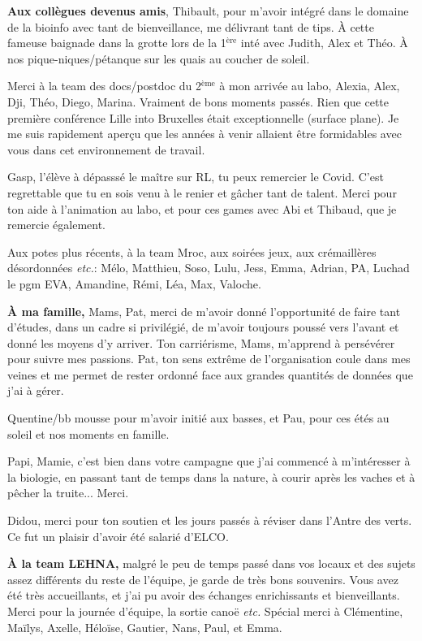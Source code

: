 \vspace*{7pt}
\textbf{Aux collègues devenus amis}, Thibault, pour m'avoir intégré dans le domaine de la bioinfo avec tant de bienveillance, me délivrant tant de tips. À cette fameuse baignade dans la grotte lors de la 1$^\text{ère}$ inté avec Judith, Alex et Théo. À nos pique-niques/pétanque sur les quais au coucher de soleil.

Merci à la team des docs/postdoc du 2$^\text{ème}$ à mon arrivée au labo, Alexia, Alex, Dji, Théo, Diego, Marina. Vraiment de bons moments passés. Rien que cette première conférence Lille into Bruxelles était exceptionnelle (surface plane). Je me suis rapidement aperçu que les années à venir allaient être formidables avec vous dans cet environnement de travail.

Gasp, l'élève à dépasssé le maître sur RL, tu peux remercier le Covid. C'est regrettable que tu en sois venu à le renier et gâcher tant de talent. Merci pour ton aide à l'animation au labo, et pour ces games avec Abi et Thibaud, que je remercie également.

Aux potes plus récents, à la team Mroc, aux soirées jeux, aux crémaillères désordonnées \textit{etc.}: Mélo, Matthieu, Soso, Lulu, Jess, Emma, Adrian, PA, Luchad le pgm EVA, Amandine, Rémi, Léa, Max, Valoche.


\vspace{17pt}\textbf{À ma famille,}
Mams, Pat, merci de m'avoir donné l'opportunité de faire tant d'études, dans un cadre si privilégié, de m'avoir toujours poussé vers l'avant et donné les moyens d'y arriver. Ton carriérisme, Mams, m'apprend à persévérer pour suivre mes passions. Pat, ton sens extrême de l'organisation coule dans mes veines et me permet de rester ordonné face aux grandes quantités de données que j'ai à gérer.

Quentine/bb mousse pour m'avoir initié aux basses, et Pau, pour ces étés au soleil et nos moments en famille.

Papi, Mamie, c'est bien dans votre campagne que j'ai commencé à m'intéresser à la biologie, en passant tant de temps dans la nature, à courir après les vaches et à pêcher la truite... Merci.

Didou, merci pour ton soutien et les jours passés à réviser dans l'Antre des verts. Ce fut un plaisir d'avoir été salarié d'ELCO.


\vspace*{7pt}
\textbf{À la team LEHNA,}
malgré le peu de temps passé dans vos locaux et des sujets assez différents du reste de l'équipe, je garde de très bons souvenirs. Vous avez été très accueillants, et j'ai pu avoir des échanges enrichissants et bienveillants. Merci pour la journée d'équipe, la sortie canoë \textit{etc.} Spécial merci à Clémentine, Maïlys, Axelle, Héloïse, Gautier, Nans, Paul, et Emma.



